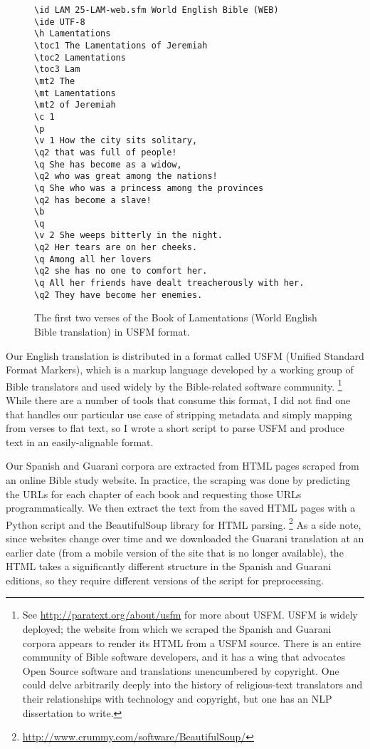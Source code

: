 \begin{figure*}
\raggedright \begin{verbatim}
\id LAM 25-LAM-web.sfm World English Bible (WEB) 
\ide UTF-8
\h Lamentations 
\toc1 The Lamentations of Jeremiah 
\toc2 Lamentations 
\toc3 Lam 
\mt2 The 
\mt Lamentations 
\mt2 of Jeremiah 
\c 1  
\p
\v 1 How the city sits solitary, 
\q2 that was full of people! 
\q She has become as a widow, 
\q2 who was great among the nations! 
\q She who was a princess among the provinces 
\q2 has become a slave! 
\b
\q
\v 2 She weeps bitterly in the night. 
\q2 Her tears are on her cheeks. 
\q Among all her lovers 
\q2 she has no one to comfort her. 
\q All her friends have dealt treacherously with her. 
\q2 They have become her enemies. 
\end{verbatim}
  \caption{The first two verses of the Book of Lamentations (World English
  Bible translation) in USFM format.}
  \label{fig:usfmsample}
\end{figure*}


Our English translation is distributed in a format called USFM (Unified
Standard Format Markers), which is a markup language developed by a working
group of Bible translators and used widely by the Bible-related software
community.
\footnote{See \url{http://paratext.org/about/usfm} for more about USFM. USFM is
widely deployed; the website from which we scraped the Spanish and Guarani
corpora appears to render its HTML from a USFM source.  There is an entire
community of Bible software developers, and it has a wing that advocates Open
Source software and translations unencumbered by copyright.  One could delve
arbitrarily deeply into the history of religious-text translators and their
relationships with technology and copyright, but one has an NLP dissertation to
write.}
While there are a number of tools that consume this format, I did not find one
that handles our particular use case of stripping metadata and simply mapping
from verses to flat text, so I wrote a short script to parse USFM and produce
text in an easily-alignable format.


Our Spanish and Guarani corpora are extracted from HTML pages scraped from an
online Bible study website. In practice, the scraping was done by predicting
the URLs for each chapter of each book and requesting those URLs
programmatically. We then extract the text from the saved HTML pages with a
Python script and the BeautifulSoup library for HTML parsing.
\footnote{\url{http://www.crummy.com/software/BeautifulSoup/}}
As a side note, since websites change over time and we
downloaded the Guarani translation at an earlier date (from a mobile version of
the site that is no longer available), the HTML takes a significantly different
structure in the Spanish and Guarani editions, so they require different
versions of the script for preprocessing.

